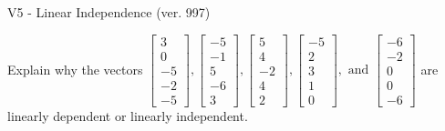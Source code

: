 \begin{exercise}
  \begin{exerciseTitle}V5 - Linear Independence (ver. 997)\end{exerciseTitle}
  \begin{exerciseStatement}
    Explain why the vectors \(\left[\begin{array}{r}
3 \\
0 \\
-5 \\
-2 \\
-5
\end{array}\right] , \left[\begin{array}{r}
-5 \\
-1 \\
5 \\
-6 \\
3
\end{array}\right] , \left[\begin{array}{r}
5 \\
4 \\
-2 \\
4 \\
2
\end{array}\right] , \left[\begin{array}{r}
-5 \\
2 \\
3 \\
1 \\
0
\end{array}\right] , \text{ and } \left[\begin{array}{r}
-6 \\
-2 \\
0 \\
0 \\
-6
\end{array}\right]\) are linearly dependent or linearly independent.	



\end{exerciseStatement}
\end{exercise}
